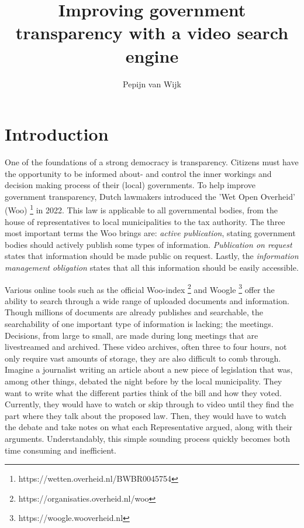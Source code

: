 \documentclass[twoside]{uva-inf-bachelor-thesis}
\title{Improving government transparency with a video search engine}
\author{Pepijn van Wijk}
\begin{document}
\maketitle

\begin{abstract}
\lipsum[2]
\end{abstract}

\tableofcontents

\chapter{Introduction}
One of the foundations of a strong democracy is transparency. Citizens must have the opportunity to be informed about- and control the inner workings and decision making process of their (local) governments. To help improve government transparency, Dutch lawmakers introduced the 'Wet Open Overheid' (Woo) \footnote{https://wetten.overheid.nl/BWBR0045754} in 2022. 
This law is applicable to all governmental bodies, from the house of representatives to local municipalities to the tax authority. The three most important terms the Woo brings are: \textit{active publication}, stating government bodies should actively publish some types of information. \textit{Publication on request} states that information should be made public on request. Lastly, the \textit{information management obligation} states that all this information should be easily accessible. 

Various online tools such as the official Woo-index \footnote{https://organisaties.overheid.nl/woo} and Woogle \footnote{https://woogle.wooverheid.nl} offer the ability to search through a wide range of uploaded documents and information. 
Though millions of documents are already publishes and searchable, the searchability of one important type of information is lacking; the meetings. Decisions, from large to small, are made during long meetings that are livestreamed and archived. These video archives, often three to four hours, not only require vast amounts of storage, they are also difficult to comb through. 
Imagine a journalist writing an article about a new piece of legislation that was, among other things, debated the night before by the local municipality. They want to write what the different parties think of the bill and how they voted. Currently, they would have to watch or skip through to video until they find the part where they talk about the proposed law. Then, they would have to watch the debate and take notes on what each Representative argued, along with their arguments.  Understandably, this simple sounding process quickly becomes both time consuming and inefficient. 
\end{document}
